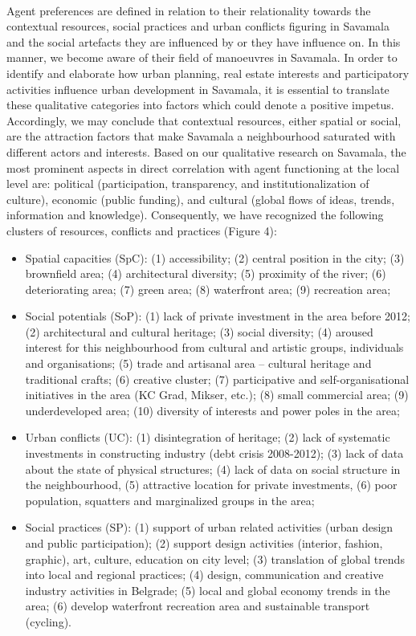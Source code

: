 \documentclass[11pt]{report}
\begin{document}
\\
Agent preferences are defined in relation to their relationality towards the contextual resources, social practices and urban conflicts figuring in Savamala and the social artefacts they are influenced by or they have influence on. In this manner, we become aware of their field of manoeuvres in Savamala. In order to identify and elaborate how urban planning, real estate interests and participatory activities influence urban development in Savamala, it is essential to translate these qualitative categories into factors which could denote a positive impetus.
\\
Accordingly, we may conclude that contextual resources, either spatial or social, are the attraction factors that make Savamala a neighbourhood saturated with different actors and interests.
Based on our qualitative research on Savamala, the most prominent aspects in direct correlation with agent functioning at the local level are: political (participation, transparency, and institutionalization of culture), economic (public funding), and cultural (global flows of ideas, trends, information and knowledge). Consequently, we have recognized the following clusters of resources, conflicts and practices (Figure 4):

\begin{itemize}
\item Spatial capacities (SpC):  (1) accessibility; (2) central position in the city; (3) brownfield area; (4) architectural diversity; (5) proximity of the river; (6) deteriorating area; (7) green area; (8) waterfront area; (9) recreation area;
\item Social potentials (SoP): (1) lack of private investment in the area before 2012; (2) architectural and cultural heritage; (3) social diversity; (4) aroused interest for this neighbourhood from cultural and artistic groups, individuals and organisations; (5) trade and artisanal area – cultural heritage and traditional crafts; (6) creative cluster; (7) participative and self-organisational initiatives in the area (KC Grad, Mikser, etc.); (8) small commercial area; (9) underdeveloped area; (10) diversity of interests and power poles in the area;
\item Urban conflicts (UC): (1) disintegration of heritage; (2) lack of systematic investments in constructing industry (debt crisis 2008-2012); (3) lack of data about the state of physical structures; (4) lack of data on social structure in the neighbourhood, (5) attractive location for private investments, (6) poor population, squatters and marginalized groups in the area;
\item Social practices (SP): (1) support of urban related activities (urban design and public participation); (2) support design activities (interior, fashion, graphic), art, culture, education on city level; (3) translation of global trends into local and regional practices; (4) design, communication and creative industry activities in Belgrade; (5) local and global economy trends in the area; (6) develop waterfront recreation area and sustainable transport (cycling).
\end{itemize}
\end{document}

